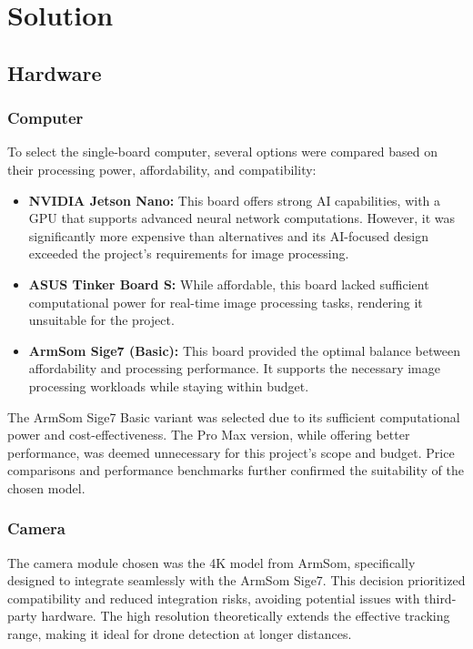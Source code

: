 \chapter{Solution}

\section{Hardware}

\subsection{Computer}
To select the single-board computer, several options were compared based on their processing power, affordability, and compatibility:
\begin{itemize}
	\item \textbf{NVIDIA Jetson Nano:} This board offers strong AI capabilities, with a GPU that supports advanced neural network computations. However, it was significantly more expensive than alternatives and its AI-focused design exceeded the project's requirements for image processing.
	\item \textbf{ASUS Tinker Board S:} While affordable, this board lacked sufficient computational power for real-time image processing tasks, rendering it unsuitable for the project.
	\item \textbf{ArmSom Sige7 (Basic):} This board provided the optimal balance between affordability and processing performance. It supports the necessary image processing workloads while staying within budget.
\end{itemize}
The ArmSom Sige7 Basic variant was selected due to its sufficient computational power and cost-effectiveness. The Pro Max version, while offering better performance, was deemed unnecessary for this project's scope and budget. Price comparisons and performance benchmarks further confirmed the suitability of the chosen model.

\subsection{Camera}
The camera module chosen was the 4K model from ArmSom, specifically designed to integrate seamlessly with the ArmSom Sige7. This decision prioritized compatibility and reduced integration risks, avoiding potential issues with third-party hardware. The high resolution theoretically extends the effective tracking range, making it ideal for drone detection at longer distances.

